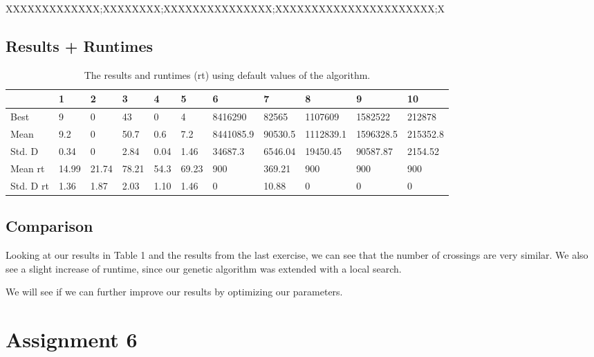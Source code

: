 \documentclass [11pt]{article}
\begin{document}
XXXXXXXXXXXXX;XXXXXXXX;XXXXXXXXXXXXXXX;XXXXXXXXXXXXXXXXXXXXXX;X



\subsection{Results + Runtimes}



\begin{table}[]
\centering
\caption{The results and runtimes (rt) using default values of the algorithm.}
\label{my-label}
\begin{tabular}{l|l|l|l|l|l|l|l|l|l|l}
               &  1 &  2 &  3 &  4 &  5 &  6 &  7 &  8 &  9 &  10                    \\ \hline
Best           & 9          & 0          & 43         & 0          & 4          & 8416290    & 82565      & 1107609    & 1582522    & \multicolumn{1}{l|}{212878}   \\ \hline
Mean           & 9.2        & 0          & 50.7       & 0.6        & 7.2        & 8441085.9  & 90530.5    & 1112839.1  & 1596328.5  & \multicolumn{1}{l|}{215352.8} \\ \hline
Std. D & 0.34       & 0          & 2.84       & 0.04       & 1.46       & 34687.3    & 6546.04    & 19450.45   & 90587.87   & \multicolumn{1}{l|}{2154.52}  \\ \hline
Mean rt   & 14.99      & 21.74      & 78.21      & 54.3       & 69.23      & 900        & 369.21     & 900        & 900        & \multicolumn{1}{l|}{900}      \\ \hline
Std. D rt   & 1.36       & 1.87       & 2.03       & 1.10       & 1.46       & 0          & 10.88      & 0          & 0          & \multicolumn{1}{l|}{0}        \\ \cline{2-11} 
\end{tabular}
\end{table}



\subsection{Comparison}


Looking at our results in Table 1 and the results from the last exercise, we can see that the number of crossings are very similar. We also see a slight increase of runtime, since our genetic algorithm was extended with a local search.

We will see if we can further improve our results by optimizing our parameters.


\section{Assignment 6}
\end{document}
